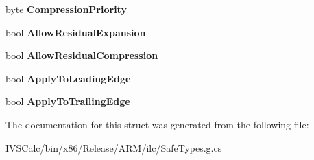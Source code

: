 \begin{DoxyCompactItemize}
byte {\bfseries Compression\+Priority}
\item 
\mbox{\label{struct_microsoft_1_1_graphics_1_1_canvas_1_1_text_1_1_canvas_justification_opportunity_a858401696fe99443d43efb6465fa4ef5}} 
bool {\bfseries Allow\+Residual\+Expansion}
\item 
\mbox{\label{struct_microsoft_1_1_graphics_1_1_canvas_1_1_text_1_1_canvas_justification_opportunity_a881e4507d3231ee056d81b0348c3a0fa}} 
bool {\bfseries Allow\+Residual\+Compression}
\item 
\mbox{\label{struct_microsoft_1_1_graphics_1_1_canvas_1_1_text_1_1_canvas_justification_opportunity_aacd75b825814035c2e307f6a65af95f2}} 
bool {\bfseries Apply\+To\+Leading\+Edge}
\item 
\mbox{\label{struct_microsoft_1_1_graphics_1_1_canvas_1_1_text_1_1_canvas_justification_opportunity_ac72f9471fb43e1144d4e5d622b85062f}} 
bool {\bfseries Apply\+To\+Trailing\+Edge}
\end{DoxyCompactItemize}


The documentation for this struct was generated from the following file\+:\begin{DoxyCompactItemize}
\item 
I\+V\+S\+Calc/bin/x86/\+Release/\+A\+R\+M/ilc/Safe\+Types.\+g.\+cs\end{DoxyCompactItemize}
